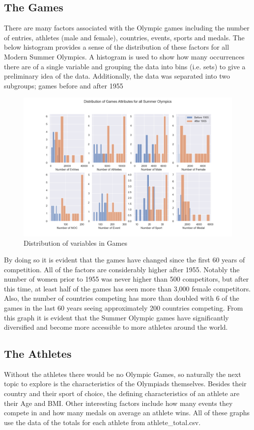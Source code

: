 \documentclass[a4 paper, 12pt]{article}
\begin{document}
    \subsection{The Games}
    There are many factors associated with the Olympic games including the number of entries, athletes (male and female), countries, events, sports and medals. The below histogram provides a sense of the distribution of these factors for all Modern Summer Olympics. A histogram is used to show how many occurrences there are of a single variable and grouping the data into bins (i.e. sets) to give a preliminary idea of the data. Additionally, the data was separated into two subgroups; games before and after 1955
        \begin{figure} [H]
            \centering
            \includegraphics[width=\textwidth, frame]
                {./images/graph/games_histogram.png}      
                \caption{Distribution of variables in Games} 
        \end{figure}
    By doing so it is evident that the games have changed since the first 60 years of competition. All of the factors are considerably higher after 1955. Notably the number of women prior to 1955 was never higher than 500 competitors, but after this time, at least half of the games has seen more than 3,000 female competitors. Also, the number of countries competing has more than doubled with 6 of the games in the last 60 years seeing approximately 200 countries competing. From this graph it is evident that the Summer Olympic games have significantly diversified and become more accessible to more athletes around the world.

    \subsection{The Athletes}
    Without the athletes there would be no Olympic Games, so naturally the next topic to explore is the characteristics of the Olympiads themselves. Besides their country and their sport of choice, the defining characteristics of an athlete are their Age and BMI. Other interesting factors include how many events they compete in and how many medals on average an athlete wins. All of these graphs use the data of the totals for each athlete from athlete\_total.csv.
    
\end{document}
